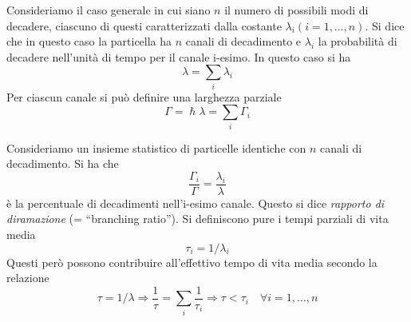 Consideriamo il caso generale in cui siano $n$ il numero di possibili modi di 
decadere, ciascuno di questi caratterizzati dalla costante 
$\lambda_i(i=1,\dots,n)$. Si dice che in questo caso la particella ha $n$ 
canali di decadimento e $\lambda_i$ la probabilità di decadere nell'unità di 
tempo per il canale i-esimo. In questo caso si ha
\begin{equation}
 \lambda = \sum_i\lambda_i
\end{equation}
Per ciascun canale si può definire una larghezza parziale
\begin{equation}
 \Gamma = \hslash \lambda = \sum_i\Gamma_i
\end{equation}

Consideriamo un insieme statistico di particelle identiche con $n$ canali di 
decadimento. Si ha che
\begin{equation}
\frac{\Gamma_i}{\Gamma} = \frac{\lambda_i}{\lambda}
\end{equation}
è la percentuale di decadimenti nell'i-esimo canale. Questo si dice 
\textit{rapporto di diramazione} (= ``branching ratio''). Si definiscono pure i 
tempi parziali di vita media
\begin{equation}
 \tau_i = 1/\lambda_i
\end{equation}
Questi però possono contribuire all'effettivo tempo di vita media secondo la 
relazione
\begin{equation}
 \tau = 1/\lambda\Rightarrow \frac{1}{\tau} = 
\sum_i\frac{1}{\tau_i}\Rightarrow\tau<\tau_i\quad\forall i = 1,\dots,n
\end{equation}

